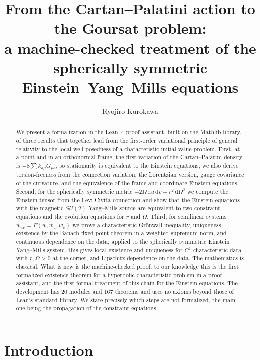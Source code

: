 \documentclass[11pt]{amsart}
\title[From the Cartan--Palatini action to the Goursat problem]{From the Cartan--Palatini action to the Goursat problem:\\ a machine-checked treatment of the spherically symmetric\\ Einstein--Yang--Mills equations}
\author{Ryojiro Kurokawa}
\theoremstyle{definition}
\theoremstyle{remark}
\newcommand{\dd}{\mathrm{d}}
\begin{document}
\begin{abstract}
We present a formalization in the Lean~4 proof assistant, built on the Mathlib library, of three results that together lead from the first-order variational principle of general relativity to the local well-posedness of a characteristic initial value problem. First, at a point and in an orthonormal frame, the first variation of the Cartan--Palatini density is $-8\sum k_{a\mu}G_{\mu a}$, so stationarity is equivalent to the Einstein equations; we also derive torsion-freeness from the connection variation, the Lorentzian version, gauge covariance of the curvature, and the equivalence of the frame and coordinate Einstein equations. Second, for the spherically symmetric metric $-2\Omega\,\dd u\,\dd v+r^2\,\dd\Omega^2$ we compute the Einstein tensor from the Levi-Civita connection and show that the Einstein equations with the magnetic $SU(2)$ Yang--Mills source are equivalent to two constraint equations and the evolution equations for $r$ and $\Omega$. Third, for semilinear systems $w_{uv}=F(w,w_u,w_v)$ we prove a characteristic Gr\"onwall inequality, uniqueness, existence by the Banach fixed-point theorem in a weighted supremum norm, and continuous dependence on the data; applied to the spherically symmetric Einstein--Yang--Mills system, this gives local existence and uniqueness for $C^1$ characteristic data with $r,\Omega>0$ at the corner, and Lipschitz dependence on the data. The mathematics is classical. What is new is the machine-checked proof: to our knowledge this is the first formalized existence theorem for a hyperbolic characteristic problem in a proof assistant, and the first formal treatment of this chain for the Einstein equations. The development has 20 modules and 167 theorems and uses no axioms beyond those of Lean's standard library. We state precisely which steps are not formalized, the main one being the propagation of the constraint equations.
\end{abstract}

\maketitle

\section{Introduction}
\end{document}
